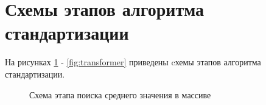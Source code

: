 \section{Схемы этапов алгоритма стандартизации}

На рисунках \ref{fig:mean} - \ref{fig:transformer} приведены cхемы этапов алгоритма стандартизации.

\newpage
\begin{figure}[h!]
	
	
	\caption{Схема этапа поиска среднего значения в массиве}
	
	\label{fig:mean}
	
\end{figure}

